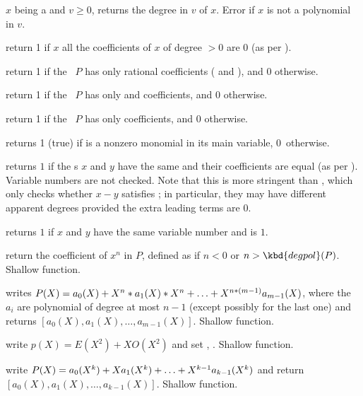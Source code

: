 
 $x$ being a  and $v \geq 0$,
returns the degree in $v$ of $x$. Error if $x$ is not a polynomial in $v$.

 return 1 if $x$ all the coefficients of
$x$ of degree $> 0$ are $0$ (as per ).

 return 1 if the ~$P$ has only
rational coefficients ( and ), and 0 otherwise.

 return 1 if the ~$P$ has only
 and  coefficients, and 0 otherwise.

 return 1 if the ~$P$ has only
 coefficients, and 0 otherwise.

 returns 1 (true) if  is a nonzero
monomial in its main variable, 0~otherwise.

 returns $1$ if the s $x$ and $y$
have the same  and their coefficients are equal (as per
). Variable numbers are not checked. Note that this is more
stringent than , which only checks whether $x - y$ satisfies
; in particular, they may have different apparent degrees provided
the extra leading terms are $0$.

 returns $1$ if $x$ and $y$
have the same variable number and  is $1$.


 return the coefficient of $x^n$ in $P$,
defined as  if $n < 0$ or $n > \kbd{degpol}(P)$. Shallow
function.

 writes
$P(X)=a_0(X)+X^n*a_1(X)*X^n+\ldots+X^{n*(m-1)}\*a_{m-1}(X)$,
where the $a_i$ are polynomial of degree at most $n-1$
(except possibly for the last one) and returns
$[a_0(X),a_1(X),\ldots,a_{m-1}(X)]$.  Shallow function.

 write $p(X) = E(X^2) +
X O(X^2)$ and set , .  Shallow function.

 write
$P(X)=a_0(X^k)+X\*a_1(X^k)+\ldots+X^{k-1}\*a_{k-1}(X^k)$ and return
$[a_0(X),a_1(X),\ldots,a_{k-1}(X)]$.  Shallow function.

